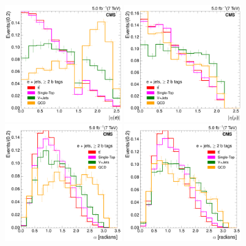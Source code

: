 \begin{figure}[hbtp]
    \centering
     \includegraphics[width=0.45\textwidth]{Chapters/07_08_09_Analysis/Images/7TeV/fit_variables/electron/MET/electron_absolute_eta/MET_inclusive_electron_absolute_eta_2orMoreBtags_templates}\hfill
     \includegraphics[width=0.45\textwidth]{Chapters/07_08_09_Analysis/Images/7TeV/fit_variables/muon/MET/muon_absolute_eta/MET_inclusive_muon_absolute_eta_2orMoreBtags_templates}\\
     \includegraphics[width=0.45\textwidth]{Chapters/07_08_09_Analysis/Images/7TeV/fit_variables/electron/MET/angle_bl/MET_inclusive_angle_bl_2orMoreBtags_templates}\hfill
     \includegraphics[width=0.45\textwidth]{Chapters/07_08_09_Analysis/Images/7TeV/fit_variables/muon/MET/angle_bl/MET_inclusive_angle_bl_2orMoreBtags_templates}\\

\end{figure}
